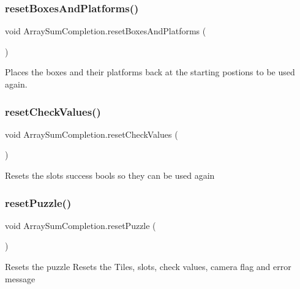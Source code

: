 \subsubsection{\texorpdfstring{reset\+Boxes\+And\+Platforms()}{resetBoxesAndPlatforms()}}
{\footnotesize\ttfamily void Array\+Sum\+Completion.\+reset\+Boxes\+And\+Platforms (\begin{DoxyParamCaption}{ }\end{DoxyParamCaption})}



Places the boxes and their platforms back at the starting postions to be used again. 

\mbox{\label{class_array_sum_completion_a3ae23072215cde0cdce19c8f8b773b7b}} 
\subsubsection{\texorpdfstring{reset\+Check\+Values()}{resetCheckValues()}}
{\footnotesize\ttfamily void Array\+Sum\+Completion.\+reset\+Check\+Values (\begin{DoxyParamCaption}{ }\end{DoxyParamCaption})}

Resets the slot\textquotesingle{}s success bools so they can be used again \mbox{\label{class_array_sum_completion_a7ebbac41382a93bf539032555a3c9bd9}} 
\subsubsection{\texorpdfstring{reset\+Puzzle()}{resetPuzzle()}}
{\footnotesize\ttfamily void Array\+Sum\+Completion.\+reset\+Puzzle (\begin{DoxyParamCaption}{ }\end{DoxyParamCaption})}

Resets the puzzle Resets the Tiles, slots, check values, camera flag and error message \mbox{\label{class_array_sum_completion_a033797d55e28346be6d4821f3bdc2daa}} 
